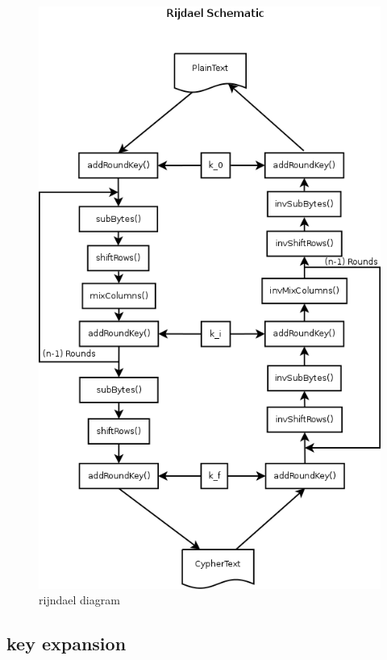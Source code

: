 \documentclass[a4paper,twoside]{llncs}
\begin{document}
\begin{figure}[h]
 \centering
 \includegraphics[scale=0.6,keepaspectratio=true]{./images/rijndaelDiagram.png}
 \caption{rijndael diagram}
 \label{fig:RijndaelDiagram}
\end{figure}


\subsection{key expansion}
\end{document}
